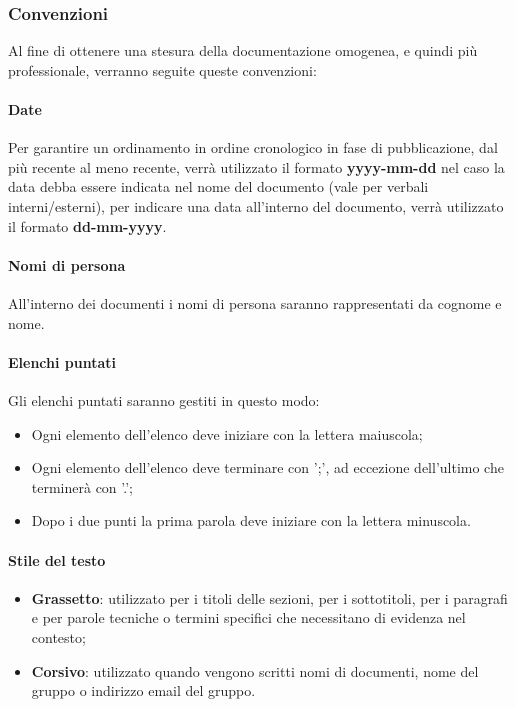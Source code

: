        \subsubsection{Convenzioni}
        Al fine di ottenere una stesura della documentazione omogenea, e quindi più professionale, verranno seguite queste convenzioni:
        \paragraph{Date}
        Per garantire un ordinamento in ordine cronologico in fase di pubblicazione, dal più recente al meno recente, verrà utilizzato il formato \textbf{yyyy-mm-dd} nel caso la data debba essere indicata nel nome del documento (vale per verbali interni/esterni), 
        per indicare una data all'interno del documento, verrà utilizzato il formato \textbf{dd-mm-yyyy}.
        \paragraph{Nomi di persona} 
        All'interno dei documenti i nomi di persona saranno rappresentati da cognome e nome.
        \paragraph{Elenchi puntati}
        Gli elenchi puntati saranno gestiti in questo modo:
        \begin{itemize}
            \item Ogni elemento dell'elenco deve iniziare con la lettera maiuscola;
            \item Ogni elemento dell'elenco deve terminare con ';', ad eccezione dell'ultimo che terminerà con '.';
            \item Dopo i due punti la prima parola deve iniziare con la lettera minuscola.
        \end{itemize}
        \paragraph{Stile del testo}
        \begin{itemize}
            \item \textbf{Grassetto}: utilizzato per i titoli delle sezioni, per i sottotitoli, per i paragrafi e per parole tecniche o termini specifici che necessitano di evidenza nel contesto;
            \item \textbf{Corsivo}: utilizzato quando vengono scritti nomi di documenti, nome del gruppo o indirizzo email del gruppo.
        \end{itemize}
